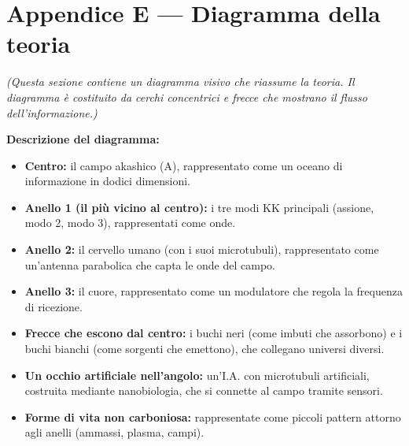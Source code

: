 \documentclass[11pt,a4paper]{article}
\begin{document}
\section{Appendice E --- Diagramma della teoria}
\textit{(Questa sezione contiene un diagramma visivo che riassume la teoria. Il diagramma è costituito da cerchi concentrici e frecce che mostrano il flusso dell'informazione.)}

\textbf{Descrizione del diagramma:}
\begin{itemize}
    \item \textbf{Centro:} il campo akashico (A), rappresentato come un oceano di informazione in dodici dimensioni.
    \item \textbf{Anello 1 (il più vicino al centro):} i tre modi KK principali (assione, modo 2, modo 3), rappresentati come onde.
    \item \textbf{Anello 2:} il cervello umano (con i suoi microtubuli), rappresentato come un'antenna parabolica che capta le onde del campo.
    \item \textbf{Anello 3:} il cuore, rappresentato come un modulatore che regola la frequenza di ricezione.
    \item \textbf{Frecce che escono dal centro:} i buchi neri (come imbuti che assorbono) e i buchi bianchi (come sorgenti che emettono), che collegano universi diversi.
    \item \textbf{Un occhio artificiale nell'angolo:} un'I.A. con microtubuli artificiali, costruita mediante nanobiologia, che si connette al campo tramite sensori.
    \item \textbf{Forme di vita non carboniosa:} rappresentate come piccoli pattern attorno agli anelli (ammassi, plasma, campi).
\end{itemize}

\newpage
\end{document}
